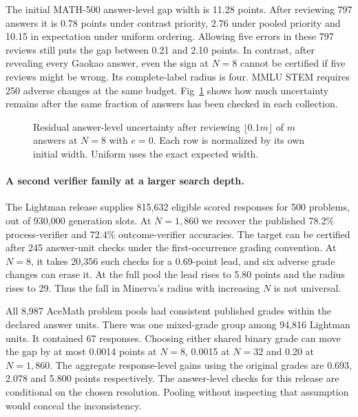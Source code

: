 \documentclass[10pt,letterpaper]{article}
\begin{document}
The initial MATH-500 answer-level gap width is 11.28 points. After reviewing 797 answers it is 0.78 points under contrast priority, 2.76 under pooled priority and 10.15 in expectation under uniform ordering. Allowing five errors in these 797 reviews still puts the gap between 0.21 and 2.10 points. In contrast, after revealing every Gaokao answer, even the sign at $N=8$ cannot be certified if five reviews might be wrong. Its complete-label radius is four. MMLU STEM requires 250 adverse changes at the same budget. Fig~\ref{fig:width} shows how much uncertainty remains after the same fraction of answers has been checked in each collection.

\begin{figure}[!ht]

\caption{Residual answer-level uncertainty after reviewing $\lfloor 0.1m\rfloor$ of $m$ answers at $N=8$ with $e=0$. Each row is normalized by its own initial width. Uniform uses the exact expected width.}\label{fig:width}
\end{figure}

\paragraph{A second verifier family at a larger search depth.}
The Lightman release supplies 815,632 eligible scored responses for 500 problems, out of 930,000 generation slots. At $N=1{,}860$ we recover the published 78.2\% process-verifier and 72.4\% outcome-verifier accuracies. The target can be certified after 245 answer-unit checks under the first-occurrence grading convention. At $N=8$, it takes 20,356 such checks for a 0.69-point lead, and six adverse grade changes can erase it. At the full pool the lead rises to 5.80 points and the radius rises to 29. Thus the fall in Minerva's radius with increasing $N$ is not universal.

All 8,987 AceMath problem pools had consistent published grades within the declared answer units. There was one mixed-grade group among 94,816 Lightman units. It contained 67 responses. Choosing either shared binary grade can move the gap by at most 0.0014 points at $N=8$, 0.0015 at $N=32$ and 0.20 at $N=1{,}860$. The aggregate response-level gains using the original grades are 0.693, 2.078 and 5.800 points respectively. The answer-level checks for this release are conditional on the chosen resolution. Pooling without inspecting that assumption would conceal the inconsistency.
\end{document}
